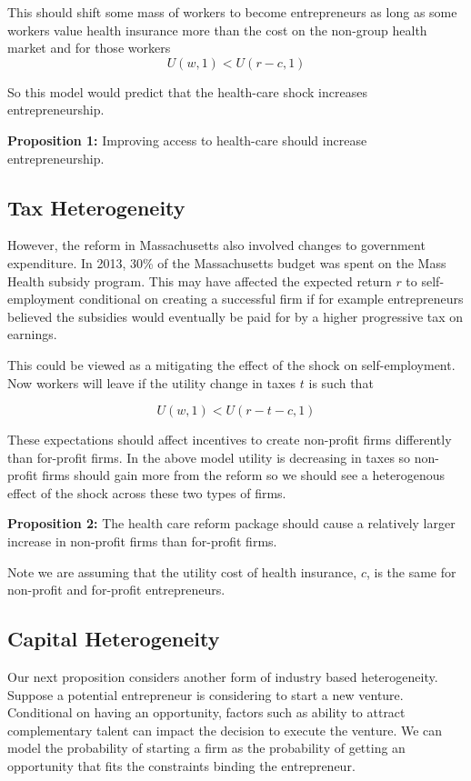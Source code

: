 \documentclass[12pt]{article}
\begin{document}
This should shift some mass of workers to become entrepreneurs as long as some workers value health insurance more than the cost on the non-group health market and for those workers
$$U(w,1) < U(r-c,1)$$

So this model would predict that the health-care shock increases entrepreneurship. 

\textbf{Proposition 1:} 
Improving access to health-care should increase entrepreneurship. 

\subsection{Tax Heterogeneity}

However, the reform in Massachusetts also involved changes to government expenditure. In 2013, 30\% of the Massachusetts budget was spent on the Mass Health \cite{masshealth} subsidy program. This may have affected the expected return $r$ to self-employment conditional on creating a successful firm if for example entrepreneurs believed the subsidies would eventually be paid for by a higher progressive tax on earnings.

This could be viewed as a mitigating the effect of the shock on self-employment. Now workers will leave if the utility change in taxes $t$ is such that

$$U(w,1) < U(r-t-c,1)$$

These expectations should affect incentives to create non-profit firms differently than for-profit firms. In the above model utility is decreasing in taxes so non-profit firms should gain more from the reform so we should see a heterogenous effect of the shock across these two types of firms.  

\textbf{Proposition 2:} 
The health care reform package should cause a relatively larger increase in non-profit firms than for-profit firms. 

Note we are assuming that the utility cost of health insurance, $c$, is the same for non-profit and for-profit entrepreneurs.  

\subsection{Capital Heterogeneity}

Our next proposition considers another form of industry based heterogeneity. Suppose a potential entrepreneur is considering to start a new venture. Conditional on having an opportunity, factors such as ability to attract complementary talent \cite{stuartSorensen} can impact the decision to execute the venture. We can model the probability of starting a firm as the probability of getting an opportunity that fits the constraints binding the entrepreneur. 
\end{document}
